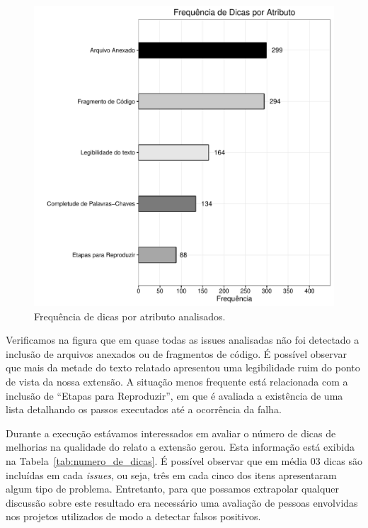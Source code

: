 \begin{figure}[htpb]
    \centering
    \includegraphics[width=0.5\linewidth]{chapter-implementacao-extensoes-fgrm/img/grafico_implementacao_extensao_freq_dicas_atributo.pdf}
    \caption{Frequência de dicas por atributo analisados.}
\label{fig:frequencia_atributos_comentario}
\end{figure}

Verificamos na figura que em quase todas as issues analisadas não foi detectado
a inclusão de arquivos anexados ou de fragmentos de código. É possível observar
que mais da metade do texto relatado apresentou uma legibilidade ruim do ponto
de vista da nossa extensão. A situação menos frequente está relacionada com a
inclusão de ``Etapas para Reproduzir'', em que é avaliada a existência de uma
lista detalhando os passos executados até a ocorrência da falha.

\begin{table}[htpb]
\centering
{}
\caption{Número de dicas retornadas pela extensão.}
\label{tab:numero_de_dicas}
\end{table}

Durante a execução estávamos interessados em avaliar o número de dicas de
melhorias na qualidade do relato a extensão gerou. Esta informação está exibida
na Tabela~\ref{tab:numero_de_dicas}. É possível observar que em média 03 dicas
são incluídas em cada \textit{issues}, ou seja, três em cada cinco dos itens
apresentaram algum tipo de problema. Entretanto, para que possamos extrapolar
qualquer discussão sobre este resultado era necessário uma avaliação de pessoas
envolvidas nos projetos utilizados de modo a detectar falsos positivos.

